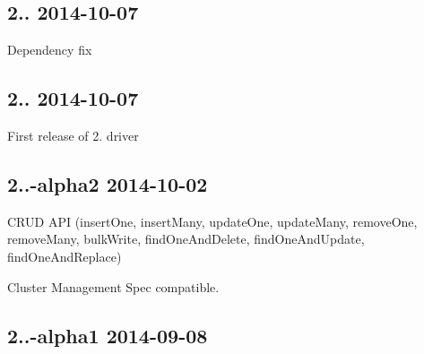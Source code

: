 \subsection*{2.. 2014-\/10-\/07 }


\begin{DoxyItemize}
\item Dependency fix
\end{DoxyItemize}

\subsection*{2.. 2014-\/10-\/07 }


\begin{DoxyItemize}
\item First release of 2. driver
\end{DoxyItemize}

\subsection*{2..-\/alpha2 2014-\/10-\/02 }


\begin{DoxyItemize}
\item C\+R\+UD A\+PI (insert\+One, insert\+Many, update\+One, update\+Many, remove\+One, remove\+Many, bulk\+Write, find\+One\+And\+Delete, find\+One\+And\+Update, find\+One\+And\+Replace)
\item Cluster Management Spec compatible.
\end{DoxyItemize}

\subsection*{2..-\/alpha1 2014-\/09-\/08 }


